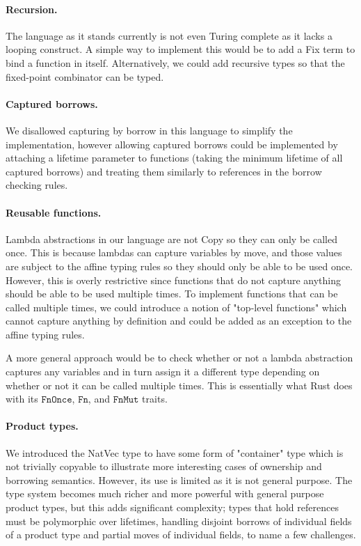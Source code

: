 \documentclass[letterpaper,11pt]{article}
\begin{document}
\paragraph{Recursion.} The language as it stands currently is not even Turing complete as it lacks a looping construct.
A simple way to implement this would be to add a Fix term to bind a function in itself. Alternatively, we could add recursive types so that the fixed-point combinator can be typed.

\paragraph{Captured borrows.} We disallowed capturing by borrow in this language to simplify the implementation,
however allowing captured borrows could be implemented by attaching a lifetime parameter to functions (taking the minimum lifetime of all captured borrows) and treating
them similarly to references in the borrow checking rules.

\paragraph{Reusable functions.} Lambda abstractions in our language are not Copy so they can only be called once. This is because lambdas 
can capture variables by move, and those values are subject to the affine typing rules so they should only be able to be used once.
However, this is overly restrictive since functions that do not capture anything should be able to be used multiple times. To implement functions that can be called multiple times,
we could introduce a notion of "top-level functions" which cannot capture anything by definition and could be added as an exception to the affine typing rules.

A more general approach would be to check whether or not a lambda abstraction captures any variables and in turn assign it a different type
depending on whether or not it can be called multiple times. This is essentially what Rust does with its $\mathtt{FnOnce}$,
$\mathtt{Fn}$, and $\mathtt{FnMut}$ traits.

\paragraph{Product types.} We introduced the NatVec type to have some form of "container" type which is not
trivially copyable to illustrate more interesting cases of ownership and borrowing semantics. However, its use is limited as it
is not general purpose. The type system becomes much richer and more powerful with general purpose product types, but this adds
significant complexity; types that hold references must be polymorphic over lifetimes, handling disjoint borrows of individual fields of a product type and 
partial moves of individual fields, to name a few challenges.
\end{document}
